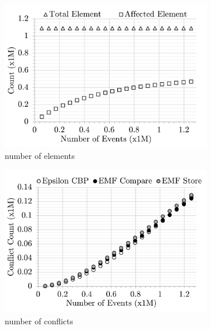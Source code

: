 \begin{figure}[ht]
    \centering
    \begin{subfigure}[t]{0.245\linewidth}
        \includegraphics[width=\linewidth]{conflict-size-events}
        \caption{number of elements}
        \label{fig:conflict-size-events}
    \end{subfigure}
    \hfill
    \begin{subfigure}[t]{0.245\linewidth}
        \includegraphics[width=\linewidth]{conflict-count-events}
        \caption{number of conflicts}
        \label{fig:conflict-count-events}
    \end{subfigure}
    \hfill
    \begin{subfigure}[t]{0.245\linewidth}

\end{subfigure}
\end{figure}
